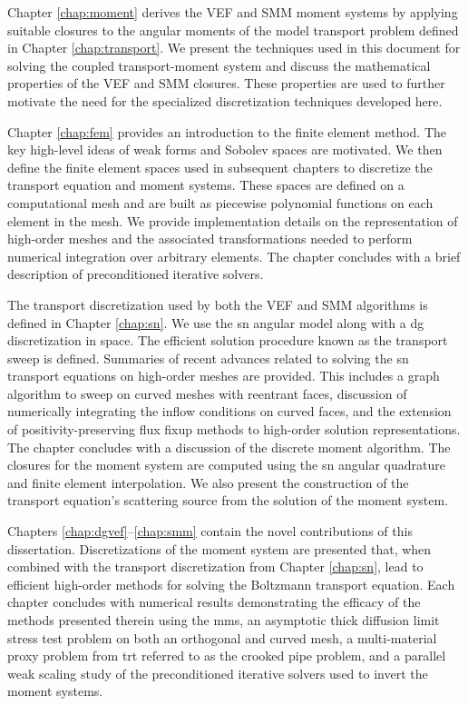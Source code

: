 \documentclass[../doc.tex]{subfiles}
\begin{document}
Chapter \ref{chap:moment} derives the VEF and SMM moment systems by applying suitable closures to the angular moments of the model transport problem defined in Chapter \ref{chap:transport}. We present the techniques used in this document for solving the coupled transport-moment system and discuss the mathematical properties of the VEF and SMM closures. These properties are used to further motivate the need for the specialized discretization techniques developed here. 

Chapter \ref{chap:fem} provides an introduction to the finite element method. The key high-level ideas of weak forms and Sobolev spaces are motivated. We then define the finite element spaces used in subsequent chapters to discretize the transport equation and moment systems. These spaces are defined on a computational mesh and are built as piecewise polynomial functions on each element in the mesh. We provide implementation details on the representation of high-order meshes and the associated transformations needed to perform numerical integration over arbitrary elements. The chapter concludes with a brief description of preconditioned iterative solvers. 

The transport discretization used by both the VEF and SMM algorithms is defined in Chapter \ref{chap:sn}. We use the \gls{sn} angular model along with a \gls{dg} discretization in space. The efficient solution procedure known as the transport sweep is defined. Summaries of recent advances related to solving the \gls{sn} transport equations on high-order meshes are provided. This includes a graph algorithm to sweep on curved meshes with reentrant faces, discussion of numerically integrating the inflow conditions on curved faces, and the extension of positivity-preserving flux fixup methods to high-order solution representations. The chapter concludes with a discussion of the discrete moment algorithm. The closures for the moment system are computed using the \gls{sn} angular quadrature and finite element interpolation. We also present the construction of the transport equation's scattering source from the solution of the moment system. 

Chapters \ref{chap:dgvef}--\ref{chap:smm} contain the novel contributions of this dissertation. Discretizations of the moment system are presented that, when combined with the transport discretization from Chapter \ref{chap:sn}, lead to efficient high-order methods for solving the Boltzmann transport equation. Each chapter concludes with numerical results demonstrating the efficacy of the methods presented therein using the \gls{mms}, an asymptotic thick diffusion limit stress test problem on both an orthogonal and curved mesh, a multi-material proxy problem from \gls{trt} referred to as the crooked pipe problem, and a parallel weak scaling study of the preconditioned iterative solvers used to invert the moment systems. 
\end{document}
